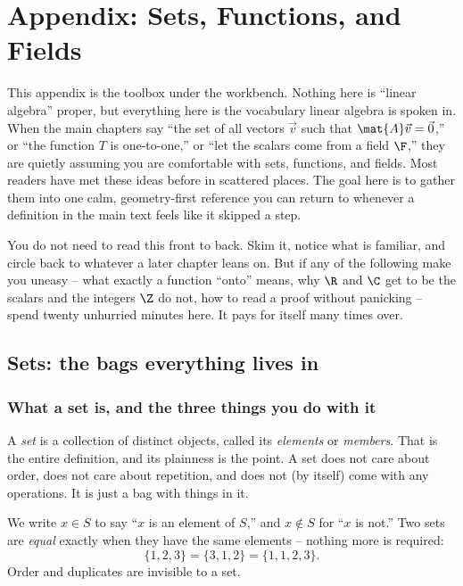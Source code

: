 \chapter{Appendix: Sets, Functions, and Fields}

This appendix is the toolbox under the workbench. Nothing here is ``linear algebra''
proper, but everything here is the vocabulary linear algebra is spoken in. When the main
chapters say ``the set of all vectors $\vec{v}$ such that $\mat{A}\vec{v} = \vec{0}$,'' or
``the function $T$ is one-to-one,'' or ``let the scalars come from a field $\F$,'' they
are quietly assuming you are comfortable with sets, functions, and fields. Most readers
have met these ideas before in scattered places. The goal here is to gather them into one
calm, geometry-first reference you can return to whenever a definition in the main text
feels like it skipped a step.

You do not need to read this front to back. Skim it, notice what is familiar, and circle
back to whatever a later chapter leans on. But if any of the following make you uneasy --
what exactly a function ``onto'' means, why $\R$ and $\C$ get to be the scalars and the
integers $\Z$ do not, how to read a proof without panicking -- spend twenty unhurried
minutes here. It pays for itself many times over.

\chapterline

\section{Sets: the bags everything lives in}

\subsection{What a set is, and the three things you do with it}

A \emph{set} is a collection of distinct objects, called its \emph{elements} or
\emph{members}. That is the entire definition, and its plainness is the point. A set does
not care about order, does not care about repetition, and does not (by itself) come with
any operations. It is just a bag with things in it.

We write $x \in S$ to say ``$x$ is an element of $S$,'' and $x \notin S$ for ``$x$ is
not.'' Two sets are \emph{equal} exactly when they have the same elements -- nothing more
is required:
\[
  \{1,2,3\} = \{3,1,2\} = \{1,1,2,3\}.
\]
Order and duplicates are invisible to a set.

